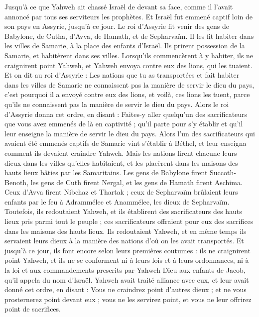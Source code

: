 \begin{multicols}{2}
Jusqu’à ce que Yahweh ait chassé Israël de devant sa face, comme il l’avait annoncé par tous ses serviteurs les prophètes. Et Israël fut emmené captif loin de son pays en Assyrie, jusqu’à ce jour.
Le roi d’Assyrie fit venir des gens de Babylone, de Cutha, d’Avva, de Hamath, et de Sepharvaïm. Il les fit habiter dans les villes de Samarie, à la place des enfants d’Israël. Ils prirent possession de la Samarie, et habitèrent dans ses villes.
Lorsqu’ils commencèrent à y habiter, ils ne craignirent point Yahweh, et Yahweh envoya contre eux des lions, qui les tuaient.
Et on dit au roi d’Assyrie : Les nations que tu as transportées et fait habiter dans les villes de Samarie ne connaissent pas la manière de servir le dieu du pays, c’est pourquoi il a envoyé contre eux des lions, et voilà, ces lions les tuent, parce qu’ils ne connaissent pas la manière de servir le dieu du pays.
Alors le roi d’Assyrie donna cet ordre, en disant : Faites-y aller quelqu’un des sacrificateurs que vous avez emmenés de là en captivité ; qu’il parte pour s’y établir et qu’il leur enseigne la manière de servir le dieu du pays.
Alors l’un des sacrificateurs qui avaient été emmenés captifs de Samarie vint s’établir à Béthel, et leur enseigna comment ils devaient craindre Yahweh.
Mais les nations firent chacune leurs dieux dans les villes qu’elles habitaient, et les placèrent dans les maisons des hauts lieux bâties par les Samaritains.
Les gens de Babylone firent Succoth-Benoth, les gens de Cuth firent Nergal, et les gens de Hamath firent Aschima.
Ceux d’Avva firent Nibchaz et Thartak ; ceux de Sepharvaïm brûlaient leurs enfants par le feu à Adrammélec et Anammélec, les dieux de Sepharvaïm.
Toutefois, ils redoutaient Yahweh, et ils établirent des sacrificateurs des hauts lieux pris parmi tout le peuple ; ces sacrificateurs offraient pour eux des sacrifices dans les maisons des hauts lieux.
Ils redoutaient Yahweh, et en même temps ils servaient leurs dieux à la manière des nations d’où on les avait transportés.
Et jusqu’à ce jour, ils font encore selon leurs premières coutumes : ils ne craignirent point Yahweh, et ils ne se conforment ni à leurs lois et à leurs ordonnances, ni à la loi et aux commandements prescrits par Yahweh Dieu aux enfants de Jacob, qu’il appela du nom d’Israël.
Yahweh avait traité alliance avec eux, et leur avait donné cet ordre, en disant : Vous ne craindrez point d’autres dieux ; et ne vous prosternerez point devant eux ; vous ne les servirez point, et vous ne leur offrirez point de sacrifices.

\end{multicols}
